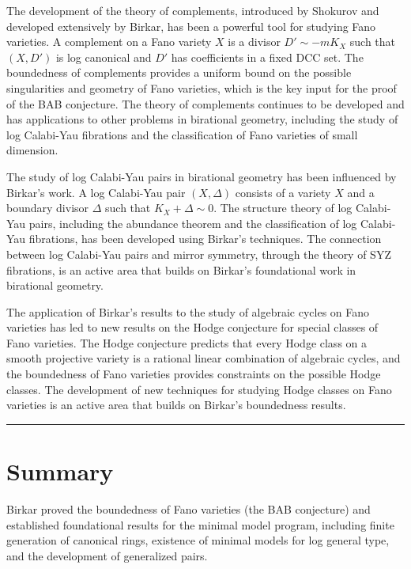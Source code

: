 The development of the theory of complements, introduced by Shokurov and developed extensively by Birkar, has been a powerful tool for studying Fano varieties. A complement on a Fano variety $X$ is a divisor $D' \sim -mK_X$ such that $(X, D')$ is log canonical and $D'$ has coefficients in a fixed DCC set. The boundedness of complements provides a uniform bound on the possible singularities and geometry of Fano varieties, which is the key input for the proof of the BAB conjecture. The theory of complements continues to be developed and has applications to other problems in birational geometry, including the study of log Calabi-Yau fibrations and the classification of Fano varieties of small dimension.

The study of log Calabi-Yau pairs in birational geometry has been influenced by Birkar's work. A log Calabi-Yau pair $(X, \Delta)$ consists of a variety $X$ and a boundary divisor $\Delta$ such that $K_X + \Delta \sim 0$. The structure theory of log Calabi-Yau pairs, including the abundance theorem and the classification of log Calabi-Yau fibrations, has been developed using Birkar's techniques. The connection between log Calabi-Yau pairs and mirror symmetry, through the theory of SYZ fibrations, is an active area that builds on Birkar's foundational work in birational geometry.

The application of Birkar's results to the study of algebraic cycles on Fano varieties has led to new results on the Hodge conjecture for special classes of Fano varieties. The Hodge conjecture predicts that every Hodge class on a smooth projective variety is a rational linear combination of algebraic cycles, and the boundedness of Fano varieties provides constraints on the possible Hodge classes. The development of new techniques for studying Hodge classes on Fano varieties is an active area that builds on Birkar's boundedness results.

\begin{center}\rule{0.5\linewidth}{0.5pt}\end{center}

\section*{Summary}

Birkar proved the boundedness of Fano varieties (the BAB conjecture) and established foundational results for the minimal model program, including finite generation of canonical rings, existence of minimal models for log general type, and the development of generalized pairs.
